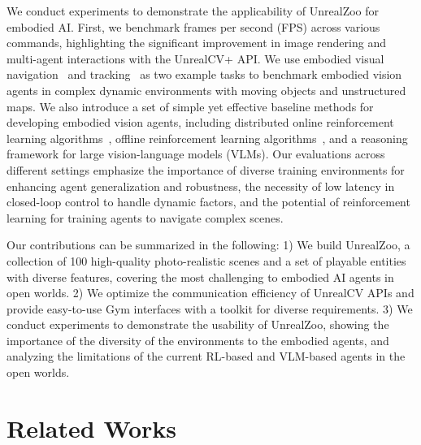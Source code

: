\documentclass{article}
\begin{document}
We conduct experiments to demonstrate the applicability of UnrealZoo for embodied AI. First, we benchmark frames per second (FPS) across various commands, highlighting the significant improvement in image rendering and multi-agent interactions with the UnrealCV+ API. We use embodied visual navigation~\citep{thor2017} and tracking~\citep{luo2018end, zhong2021distractor} as two example tasks to benchmark embodied vision agents in complex dynamic environments with moving objects and unstructured maps. We also introduce a set of simple yet effective baseline methods for developing embodied vision agents, including distributed online reinforcement learning algorithms~\citep{mnih2016asynchronous}, offline reinforcement learning algorithms~\citep{kumar2020conservative}, and a reasoning framework for large vision-language models (VLMs). Our evaluations across different settings emphasize the importance of diverse training environments for enhancing agent generalization and robustness, the necessity of low latency in closed-loop control to handle dynamic factors, and the potential of reinforcement learning for training agents to navigate complex scenes.

Our contributions can be summarized in the following:
1) We build UnrealZoo, a collection of 100 high-quality photo-realistic scenes and a set of playable entities with diverse features, covering the most challenging to embodied AI agents in open worlds.
2) We optimize the communication efficiency of UnrealCV APIs and provide easy-to-use Gym interfaces with a toolkit for diverse requirements.
3) We conduct experiments to demonstrate the usability of UnrealZoo, showing the importance of the diversity of the environments to the embodied agents, and analyzing the limitations of the current RL-based and VLM-based agents in the open worlds.



\section{Related Works}
\end{document}
